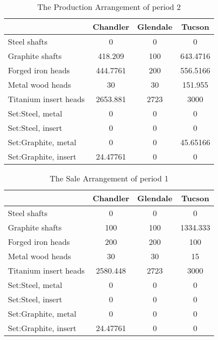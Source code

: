 \documentclass[12pt]{article}
\begin{document}
\begin{table}[H]
	\centering
	\setlength{\belowcaptionskip}{0.1cm}
	\caption{The Production Arrangement of period 2}
	\label{tab20}
	\begin{tabular}{lccc}
		\hline
		\hline
		&Chandler&Glendale&	Tucson\\
		\hline
		Steel shafts& 0&0&0\\
		Graphite shafts&418.209&100&643.4716\\
		Forged iron heads&444.7761&200&556.5166 \\
		Metal wood heads&30&30&151.955\\
		Titanium insert heads&2653.881 &2723&3000\\
		Set:Steel, metal&0&0&0\\
		Set:Steel, insert&0&0&0\\
		Set:Graphite, metal&0&0&45.65166\\
		Set:Graphite, insert&24.47761 &0&0\\
		\hline
		\hline
	\end{tabular}
\end{table}

\begin{table}[H]
	\centering
	\setlength{\belowcaptionskip}{0.1cm}
	\caption{The Sale Arrangement of period 1}
	\label{tab21}
	\begin{tabular}{lccc}
		\hline
		\hline
		&Chandler&Glendale&	Tucson\\
		\hline
		Steel shafts& 0&0&0\\
		Graphite shafts& 100&100&1334.333 \\
		Forged iron heads&200&200&100\\
		Metal wood heads&30&30&15\\
		Titanium insert heads&2580.448&2723&3000\\
		Set:Steel, metal&0&0&0\\
		Set:Steel, insert&0&0&0\\
		Set:Graphite, metal&0&0&0\\
		Set:Graphite, insert&24.47761&0&0\\
		\hline
		\hline
	\end{tabular}
\end{table}
\end{document}
